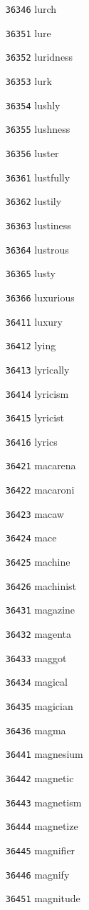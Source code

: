 \documentclass[twoside,11pt]{article}
\begin{document}
\begin{multicols}{5}
\begin{enumerate}
\item[\texttt{36346}] lurch
\item[\texttt{36351}] lure
\item[\texttt{36352}] luridness
\item[\texttt{36353}] lurk
\item[\texttt{36354}] lushly
\item[\texttt{36355}] lushness
\item[\texttt{36356}] luster
\item[\texttt{36361}] lustfully
\item[\texttt{36362}] lustily
\item[\texttt{36363}] lustiness
\item[\texttt{36364}] lustrous
\item[\texttt{36365}] lusty
\item[\texttt{36366}] luxurious
\item[\texttt{36411}] luxury
\item[\texttt{36412}] lying
\item[\texttt{36413}] lyrically
\item[\texttt{36414}] lyricism
\item[\texttt{36415}] lyricist
\item[\texttt{36416}] lyrics
\item[\texttt{36421}] macarena
\item[\texttt{36422}] macaroni
\item[\texttt{36423}] macaw
\item[\texttt{36424}] mace
\item[\texttt{36425}] machine
\item[\texttt{36426}] machinist
\item[\texttt{36431}] magazine
\item[\texttt{36432}] magenta
\item[\texttt{36433}] maggot
\item[\texttt{36434}] magical
\item[\texttt{36435}] magician
\item[\texttt{36436}] magma
\item[\texttt{36441}] magnesium
\item[\texttt{36442}] magnetic
\item[\texttt{36443}] magnetism
\item[\texttt{36444}] magnetize
\item[\texttt{36445}] magnifier
\item[\texttt{36446}] magnify
\item[\texttt{36451}] magnitude

\end{enumerate}
\end{multicols}
\end{document}

